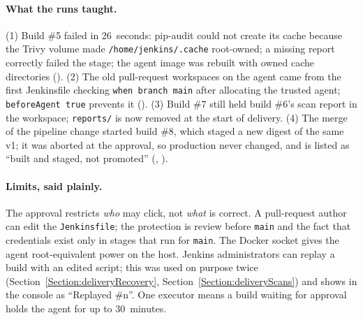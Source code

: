 \paragraph{What the runs taught.} (1) Build \#5 failed in 26~seconds: pip-audit could not create its cache because the Trivy volume made \texttt{/home/jenkins/.cache} root-owned; a missing report correctly failed the stage; the agent image
was rebuilt with owned cache directories (). (2) The old pull-request workspaces on the agent came from the first Jenkinsfile checking \texttt{when branch main} after allocating the trusted agent; \texttt{beforeAgent true} prevents it ().
(3) Build \#7 still held build \#6's scan report in the workspace; \texttt{reports/} is now removed at the start of delivery. (4) The merge of the pipeline change started build \#8, which staged a new digest of the same v1; it was aborted at the approval,
so production never changed, and is listed as ``built and staged, not promoted'' (, ).

\paragraph{Limits, said plainly.} The approval restricts \emph{who} may click, not \emph{what} is correct. A pull-request author can edit the \texttt{Jenkinsfile}; the protection is review before \texttt{main} and the fact that credentials exist only in stages that run for \texttt{main}.
The Docker socket gives the agent root-equivalent power on the host. Jenkins administrators can replay a build with an edited script; this was used on purpose twice (Section~\ref{Section:deliveryRecovery}, Section~\ref{Section:deliveryScans}) and shows in the console as ``Replayed \#n''.
One executor means a build waiting for approval holds the agent for up to 30~minutes.

\begin{longlisting}
\inputminted[fontsize=\scriptsize]{text}{evidence/200-capacity-resize-t3-medium-and-baseline-after-bd-2026-11-12.txt}
\caption{The resize of the instance to \texttt{t3.medium} and the baseline after it, November 12, 2026 (real output).}
\label{Listing:E200}
\end{longlisting}

\begin{longlisting}
\inputminted[fontsize=\scriptsize]{text}{evidence/202-jenkins-controller-image-pip-venv-added-recreated-state-kept-bd-2026-11-12.txt}
\caption{The controller image gets pip and venv; Jenkins recreated with its volume kept (real output).}
\label{Listing:E202}
\end{longlisting}

